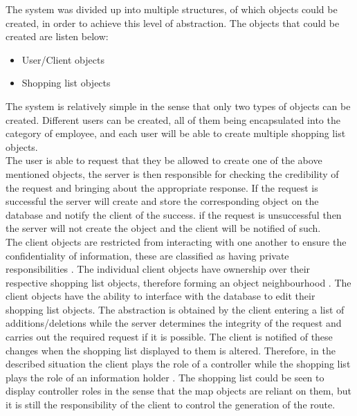 \documentclass[10pt, a4paper, onecolumn]{scrartcl}
\begin{document}
		The system was divided up into multiple structures, of which objects could be created, in order to achieve this level of abstraction. The objects that could be created are listen below:
		
		\begin{itemize}
			\item User/Client objects
			\item Shopping list objects
		\end{itemize}
		
		The system is relatively simple in the sense that only two types of objects can be created. Different users can be created, all of them being encapsulated into the category of employee, and each user will be able to create multiple shopping list objects.\\
		
		The user is able to request that they be allowed to create one of the above mentioned objects, the server is then responsible for checking the credibility of the request and bringing about the appropriate response. If the request is successful the server will create and store the corresponding object on the database and notify the client of the success. if the request is unsuccessful then the server will not create the object and the client will be notified of such. \\
		
		The client objects are restricted from interacting with one another to ensure the confidentiality of information, these are classified as having private responsibilities \cite{responsibility}. The individual client objects have ownership over their respective shopping list objects, therefore forming an object neighbourhood \cite{responsibility}. The client objects have the ability to interface with the database to edit their shopping list objects. The abstraction is obtained by the client entering a list of additions/deletions while the server determines the integrity of the request and carries out the required request if it is possible. The client is notified of these changes when the shopping list displayed to them is altered. Therefore, in the described situation the client plays the role of a controller while the shopping list plays the role of an information holder \cite{responsibility}. The shopping list could be seen to display controller roles in the sense that the map objects are reliant on them, but it is still the responsibility of the client to control the generation of the route. \\
		
\end{document}
